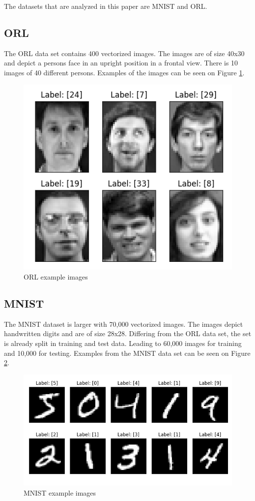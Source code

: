 The datasets that are analyzed in this paper are MNIST and ORL. 

\subsection{ORL}
The ORL data set contains 400 vectorized images. The images are of size 40x30 and depict a persons face in an upright position in a frontal view\cite{orl_images}. There is 10 images of 40 different persons. Examples of the images can be seen on Figure \ref{fig:orl-images-raw}.

\begin{figure}[htbp]
    \centering
    \includegraphics[width=0.7\columnwidth]{../source/orl/pictures/image-before-pca.png}
    \caption{ORL example images}
    \label{fig:orl-images-raw}
\end{figure}

\subsection{MNIST}
The MNIST dataset is larger with 70,000 vectorized images. The images depict handwritten digits and are of size 28x28. Differing from the ORL data set, the set is already split in training and test data. Leading to 60,000 images for training and 10,000 for testing. Examples from the MNIST data set can be seen on Figure \ref{fig:mnist-images-raw}.  

\begin{figure}[htbp]
    \centering
    \includegraphics[width=0.7\columnwidth]{../source/mnist/pictures/image-before-pca.png}
    \caption{MNIST example images}
    \label{fig:mnist-images-raw}
\end{figure}